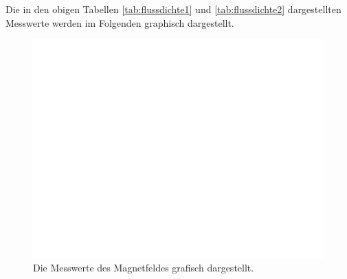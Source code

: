       Die in den obigen Tabellen \ref{tab:flussdichte1} und \ref{tab:flussdichte2} dargestellten Messwerte werden
      im Folgenden graphisch dargestellt.
      \begin{figure}
        \centering
          \includegraphics[width=\textwidth]{auswertung/magnetplot1.pdf}
          \caption{Die Messwerte des Magnetfeldes grafisch dargestellt.}
          \label{fig:magnet1}
      \end{figure}
  \label{sec:Auswertung}
